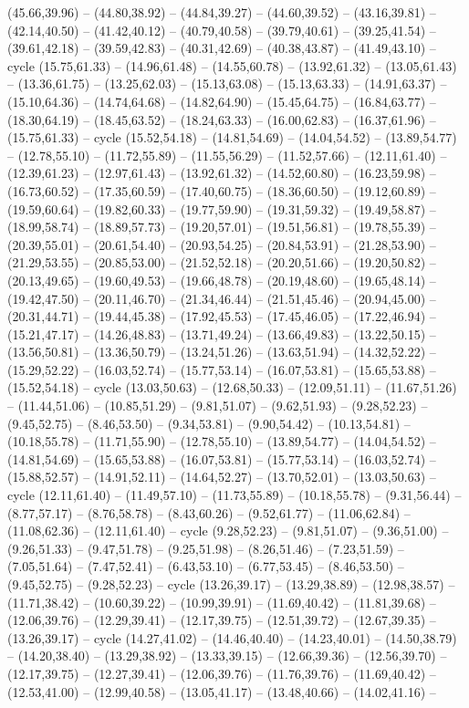 {(45.66,39.96) -- (44.80,38.92) -- (44.84,39.27) -- (44.60,39.52) -- (43.16,39.81) -- (42.14,40.50) -- (41.42,40.12) -- (40.79,40.58) -- (39.79,40.61) -- (39.25,41.54) -- (39.61,42.18) -- (39.59,42.83) -- (40.31,42.69) -- (40.38,43.87) -- (41.49,43.10) -- cycle (15.75,61.33) -- (14.96,61.48) -- (14.55,60.78) -- (13.92,61.32) -- (13.05,61.43) -- (13.36,61.75) -- (13.25,62.03) -- (15.13,63.08) -- (15.13,63.33) -- (14.91,63.37) -- (15.10,64.36) -- (14.74,64.68) -- (14.82,64.90) -- (15.45,64.75) -- (16.84,63.77) -- (18.30,64.19) -- (18.45,63.52) -- (18.24,63.33) -- (16.00,62.83) -- (16.37,61.96) -- (15.75,61.33) -- cycle (15.52,54.18) -- (14.81,54.69) -- (14.04,54.52) -- (13.89,54.77) -- (12.78,55.10) -- (11.72,55.89) -- (11.55,56.29) -- (11.52,57.66) -- (12.11,61.40) -- (12.39,61.23) -- (12.97,61.43) -- (13.92,61.32) -- (14.52,60.80) -- (16.23,59.98) -- (16.73,60.52) -- (17.35,60.59) -- (17.40,60.75) -- (18.36,60.50) -- (19.12,60.89) -- (19.59,60.64) -- (19.82,60.33) -- (19.77,59.90) -- (19.31,59.32) -- (19.49,58.87) -- (18.99,58.74) -- (18.89,57.73) -- (19.20,57.01) -- (19.51,56.81) -- (19.78,55.39) -- (20.39,55.01) -- (20.61,54.40) -- (20.93,54.25) -- (20.84,53.91) -- (21.28,53.90) -- (21.29,53.55) -- (20.85,53.00) -- (21.52,52.18) -- (20.20,51.66) -- (19.20,50.82) -- (20.13,49.65) -- (19.60,49.53) -- (19.66,48.78) -- (20.19,48.60) -- (19.65,48.14) -- (19.42,47.50) -- (20.11,46.70) -- (21.34,46.44) -- (21.51,45.46) -- (20.94,45.00) -- (20.31,44.71) -- (19.44,45.38) -- (17.92,45.53) -- (17.45,46.05) -- (17.22,46.94) -- (15.21,47.17) -- (14.26,48.83) -- (13.71,49.24) -- (13.66,49.83) -- (13.22,50.15) -- (13.56,50.81) -- (13.36,50.79) -- (13.24,51.26) -- (13.63,51.94) -- (14.32,52.22) -- (15.29,52.22) -- (16.03,52.74) -- (15.77,53.14) -- (16.07,53.81) -- (15.65,53.88) -- (15.52,54.18) -- cycle (13.03,50.63) -- (12.68,50.33) -- (12.09,51.11) -- (11.67,51.26) -- (11.44,51.06) -- (10.85,51.29) -- (9.81,51.07) -- (9.62,51.93) -- (9.28,52.23) -- (9.45,52.75) -- (8.46,53.50) -- (9.34,53.81) -- (9.90,54.42) -- (10.13,54.81) -- (10.18,55.78) -- (11.71,55.90) -- (12.78,55.10) -- (13.89,54.77) -- (14.04,54.52) -- (14.81,54.69) -- (15.65,53.88) -- (16.07,53.81) -- (15.77,53.14) -- (16.03,52.74) -- (15.88,52.57) -- (14.91,52.11) -- (14.64,52.27) -- (13.70,52.01) -- (13.03,50.63) -- cycle (12.11,61.40) -- (11.49,57.10) -- (11.73,55.89) -- (10.18,55.78) -- (9.31,56.44) -- (8.77,57.17) -- (8.76,58.78) -- (8.43,60.26) -- (9.52,61.77) -- (11.06,62.84) -- (11.08,62.36) -- (12.11,61.40) -- cycle (9.28,52.23) -- (9.81,51.07) -- (9.36,51.00) -- (9.26,51.33) -- (9.47,51.78) -- (9.25,51.98) -- (8.26,51.46) -- (7.23,51.59) -- (7.05,51.64) -- (7.47,52.41) -- (6.43,53.10) -- (6.77,53.45) -- (8.46,53.50) -- (9.45,52.75) -- (9.28,52.23) -- cycle (13.26,39.17) -- (13.29,38.89) -- (12.98,38.57) -- (11.71,38.42) -- (10.60,39.22) -- (10.99,39.91) -- (11.69,40.42) -- (11.81,39.68) -- (12.06,39.76) -- (12.29,39.41) -- (12.17,39.75) -- (12.51,39.72) -- (12.67,39.35) -- (13.26,39.17) -- cycle (14.27,41.02) -- (14.46,40.40) -- (14.23,40.01) -- (14.50,38.79) -- (14.20,38.40) -- (13.29,38.92) -- (13.33,39.15) -- (12.66,39.36) -- (12.56,39.70) -- (12.17,39.75) -- (12.27,39.41) -- (12.06,39.76) -- (11.76,39.76) -- (11.69,40.42) -- (12.53,41.00) -- (12.99,40.58) -- (13.05,41.17) -- (13.48,40.66) -- (14.02,41.16) -- }
